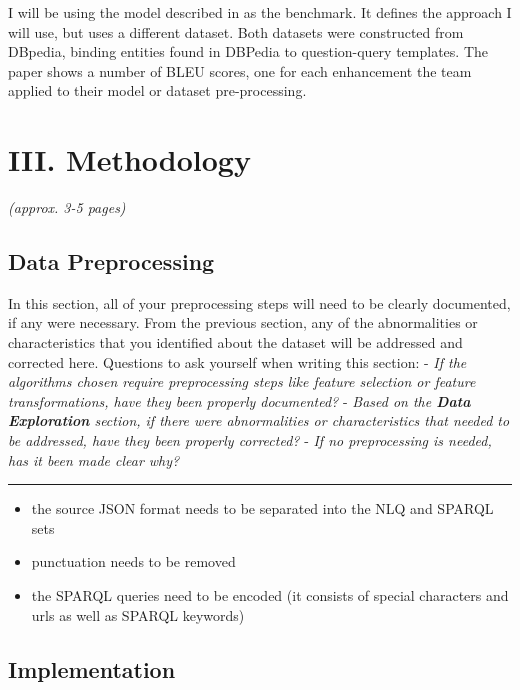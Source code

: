 \documentclass[12pt]{article}
\begin{document}
I will be using the model described in \cite{soru2018neural} as the
benchmark. It defines the approach I will use, but uses a different
dataset. Both datasets were constructed from DBpedia, binding entities
found in DBPedia to question-query templates. The paper shows a number
of BLEU scores, one for each enhancement the team applied to their model
or dataset pre-processing.

\section{III. Methodology}\label{iii.-methodology}

\emph{(approx. 3-5 pages)}

\subsection{Data Preprocessing}\label{data-preprocessing}

In this section, all of your preprocessing steps will need to be clearly
documented, if any were necessary. From the previous section, any of the
abnormalities or characteristics that you identified about the dataset
will be addressed and corrected here. Questions to ask yourself when
writing this section: - \emph{If the algorithms chosen require
preprocessing steps like feature selection or feature transformations,
have they been properly documented?} - \emph{Based on the \textbf{Data
Exploration} section, if there were abnormalities or characteristics
that needed to be addressed, have they been properly corrected?} -
\emph{If no preprocessing is needed, has it been made clear why?}

\begin{center}\rule{0.5\linewidth}{\linethickness}\end{center}

\begin{itemize}
\item
  the source JSON format needs to be separated into the NLQ and SPARQL
  sets
\item
  punctuation needs to be removed
\item
  the SPARQL queries need to be encoded (it consists of special
  characters and urls as well as SPARQL keywords)
\end{itemize}

\subsection{Implementation}\label{implementation}
\end{document}
